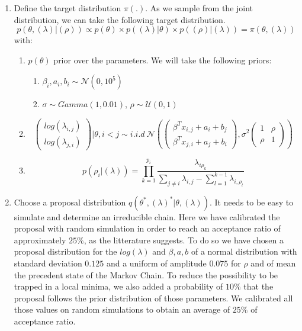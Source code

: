 \documentclass[12pt]{ociamthesis}  %
\begin{document}
	\begin{enumerate}
	
	\item Define the target distribution $\pi(.)$. As we sample from the joint distribution, we can take the following target distribution.
	\begin{equation}
	p(\theta, (\lambda)|(\rho)) \propto p(\theta) \times p((\lambda) | \theta)\times p((\rho)|(\lambda)) = \pi(\theta, (\lambda))
	\end{equation}
	with:
	\begin{enumerate}
	\item $p(\theta)$ prior over the parameters.
	We will take the following priors:
	\begin{enumerate}
		\item $\beta_{i}, a_{i}, b_{i} \sim \mathcal{N}(0, 10^{5})$
		\item $\sigma \sim Gamma(1,0.01)$, $\rho \sim \mathcal{U}(0,1)$
	\end{enumerate}
	\item
	\begin{equation}
	\begin{pmatrix}
	log(\lambda_{i,j}) \\
	log(\lambda_{j,i})
	\end{pmatrix}
	|\theta , i < j \sim i.i.d \  \mathcal{N} (\begin{pmatrix} \beta^{T}x_{i,j} + a_{i} + b_{j} \\  \beta^{T}x_{j,i} + a_{j} + b_{i} \end{pmatrix}, \sigma^{2} \begin{pmatrix} 1 & \rho \\ \rho & 1 \end{pmatrix})
	\end{equation}
	\item 
	\begin{equation}
	p(\rho_{i} | (\lambda)) = \prod_{k = 1}^{p_{i}}\frac{\lambda_{i\rho_{k}}}{\sum_{j \neq i}\lambda_{i,j} - \sum_{l = 1}^{k - 1}\lambda_{i,\rho_{l}}  }
	\end{equation}
	\end{enumerate}
	\item Choose a proposal distribution $q(\theta^{*}, (\lambda)^{*} |\theta, (\lambda))$. It needs to be easy to simulate and determine an irreducible chain. Here we have calibrated the proposal with random simulation in order to reach an acceptance ratio of approximately $25\%$, as the litterature suggests. To do so we have chosen a proposal distribution for the $log(\lambda)$ and \boldmath $\beta, a, b$ \unboldmath of a normal distribution with standard deviation $0.125$ and a uniform of amplitude $0.075$ for $\rho$ and of mean the precedent state of the Markov Chain. To reduce the possibility to be trapped in a local minima, we also added a probability of $10\%$ that the proposal follows the prior distribution of those parameters. We calibrated all those values on random simulations to obtain an average of $25\%$ of acceptance ratio.
	

\end{enumerate}
\end{document}
